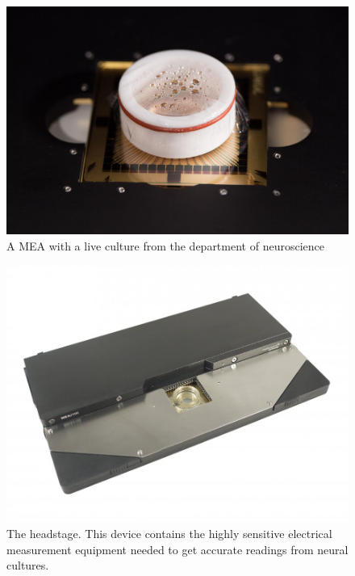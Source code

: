 \begin{figure}[h!]
    \includegraphics[width=\linewidth]{images/st-olavs-mea.jpg}
    \caption{A MEA with a live culture from the department of neuroscience}
    \label{fig:st_olav_MEA}
\end{figure}
\begin{figure}[h!]
    \includegraphics[width=\linewidth]{images/MEA2100-HS60.jpg}
    \caption{The headstage.
      This device contains the highly sensitive electrical
      measurement equipment needed to get accurate readings from neural
      cultures.
    }
    \label{fig:headstage}
\end{figure}
